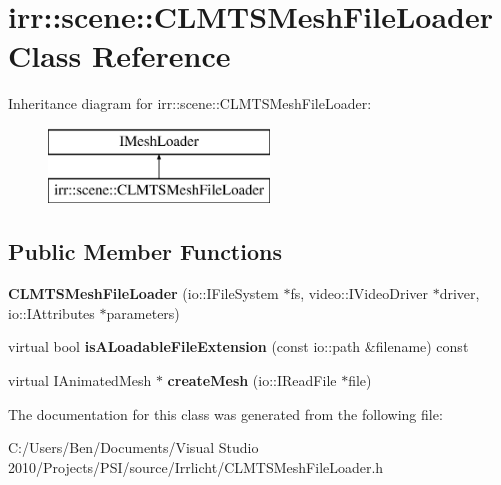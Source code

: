 \hypertarget{classirr_1_1scene_1_1_c_l_m_t_s_mesh_file_loader}{\section{irr\-:\-:scene\-:\-:C\-L\-M\-T\-S\-Mesh\-File\-Loader Class Reference}
\label{classirr_1_1scene_1_1_c_l_m_t_s_mesh_file_loader}
}
Inheritance diagram for irr\-:\-:scene\-:\-:C\-L\-M\-T\-S\-Mesh\-File\-Loader\-:\begin{figure}[H]
\begin{center}
\leavevmode
\includegraphics[height=2.000000cm]{classirr_1_1scene_1_1_c_l_m_t_s_mesh_file_loader}
\end{center}
\end{figure}
\subsection*{Public Member Functions}
\begin{DoxyCompactItemize}
\item 
\hypertarget{classirr_1_1scene_1_1_c_l_m_t_s_mesh_file_loader_a11ba22ea20e3988a744e129b706fb862}{{\bfseries C\-L\-M\-T\-S\-Mesh\-File\-Loader} (io\-::\-I\-File\-System $\ast$fs, video\-::\-I\-Video\-Driver $\ast$driver, io\-::\-I\-Attributes $\ast$parameters)}\label{classirr_1_1scene_1_1_c_l_m_t_s_mesh_file_loader_a11ba22ea20e3988a744e129b706fb862}

\item 
\hypertarget{classirr_1_1scene_1_1_c_l_m_t_s_mesh_file_loader_a1beee0866acdaf2a587211a291ca8237}{virtual bool {\bfseries is\-A\-Loadable\-File\-Extension} (const io\-::path \&filename) const }\label{classirr_1_1scene_1_1_c_l_m_t_s_mesh_file_loader_a1beee0866acdaf2a587211a291ca8237}

\item 
\hypertarget{classirr_1_1scene_1_1_c_l_m_t_s_mesh_file_loader_afe78c4c9cf1f608f7de897e16abce4a5}{virtual I\-Animated\-Mesh $\ast$ {\bfseries create\-Mesh} (io\-::\-I\-Read\-File $\ast$file)}\label{classirr_1_1scene_1_1_c_l_m_t_s_mesh_file_loader_afe78c4c9cf1f608f7de897e16abce4a5}

\end{DoxyCompactItemize}


The documentation for this class was generated from the following file\-:\begin{DoxyCompactItemize}
\item 
C\-:/\-Users/\-Ben/\-Documents/\-Visual Studio 2010/\-Projects/\-P\-S\-I/source/\-Irrlicht/C\-L\-M\-T\-S\-Mesh\-File\-Loader.\-h\end{DoxyCompactItemize}
